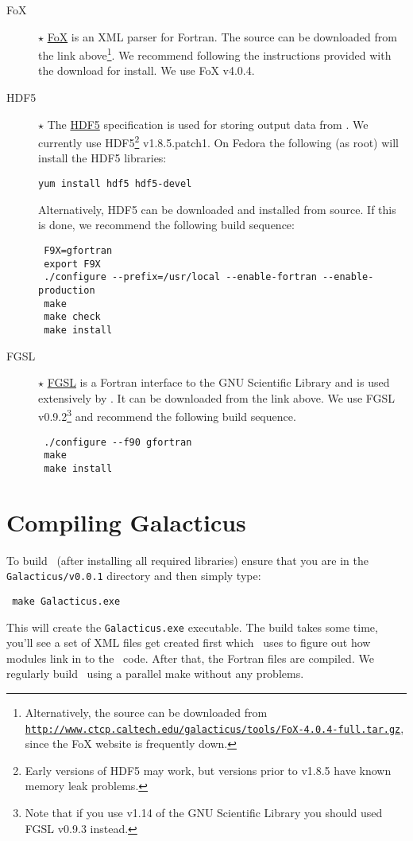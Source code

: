 \begin{description}
 \item [FoX] $\star$ \href{http://uszla.me.uk/space/software/FoX/}{FoX} is an XML parser for Fortran. The source can be downloaded from the link above\footnote{Alternatively, the source can be downloaded from \href{http://www.ctcp.caltech.edu/galacticus/tools/FoX-4.0.4-full.tar.gz}{\tt http://www.ctcp.caltech.edu/galacticus/tools/FoX-4.0.4-full.tar.gz}, since the FoX website is frequently down.}. We recommend following the instructions provided with the download for install. We use FoX v4.0.4.

 \item [HDF5] $\star$ The \href{http://hdf4.org/HDF5/}{HDF5} specification is used for storing output data from \glc. We currently use HDF5\footnote{Early versions of HDF5 may work, but versions prior to v1.8.5 have known memory leak problems.} v1.8.5.patch1. On Fedora the following (as root) will install the HDF5 libraries:
\begin{verbatim}
yum install hdf5 hdf5-devel
\end{verbatim}
Alternatively, HDF5 can be downloaded and installed from source. If this is done, we recommend the following build sequence:
\begin{verbatim}
 F9X=gfortran
 export F9X
 ./configure --prefix=/usr/local --enable-fortran --enable-production
 make
 make check
 make install
\end{verbatim}

 \item [FGSL] $\star$ \href{http://www.lrz-muenchen.de/services/software/mathematik/gsl/fortran/}{FGSL} is a Fortran interface to the GNU Scientific Library and is used extensively by \glc. It can be downloaded from the link above. We use FGSL v0.9.2\footnote{Note that if you use v1.14 of the GNU Scientific Library you should used FGSL v0.9.3 instead.} and recommend the following build sequence. 
\begin{verbatim}
 ./configure --f90 gfortran
 make
 make install
\end{verbatim}

\end{description}

\section{Compiling Galacticus}

To build \glc\ (after installing all required libraries) ensure that you are in the {\tt Galacticus/v0.0.1} directory and then simply type:
\begin{verbatim}
 make Galacticus.exe
\end{verbatim}
This will create the {\tt Galacticus.exe} executable. The build takes some time, you'll see a set of XML files get created first which \glc\ uses to figure out how modules link in to the \glc\ code. After that, the Fortran files are compiled. We regularly build \glc\ using a parallel make without any problems.


